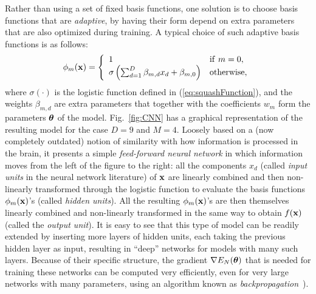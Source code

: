 \documentclass[10pt,twoside]{book}
\begin{document}
Rather than using 
a set of fixed
basis functions, one solution is to 
choose basis functions that are \emph{adaptive},
by having their form 
depend on extra parameters that are also optimized during training. A typical choice of such adaptive basis functions is as follows:
\begin{equation}
  \phi_m( \mathbf{x} ) = 
  \left\{
  \begin{array}{ll}
  1 & \mathrm{if} \,\, m=0,\\
  \sigma\left( \sum_{d=1}^D \beta_{m,d} x_{d} + \beta_{m,0} \right) & \mathrm{otherwise,}
  \end{array}
  \right.
  \label{eq:adaptiveBasisFunction}
\end{equation}
where 
$\sigma(\cdot)$ is the logistic function defined in (\eqref{eq:squashFunction}),
and the weights 
$\beta_{m,d}$ 
are extra parameters 
that together with the coefficients 
$w_m$ 
form the 
parameters ${\mbox{\boldmath {${\theta}$}}}$
of the model.
%
Fig.~\ref{fig:CNN} has a graphical representation of the resulting model for the case $D=9$ and $M=4$.
Loosely based on a (now completely outdated) notion of similarity with how information is processed in the brain, it presents a simple \emph{feed-forward neural network} in which information moves from the left of the figure to the right:
all the 
components $x_d$ (called \emph{input units} in the neural network literature) of $\mathbf{x}$ are linearly combined and then non-linearly transformed through the logistic function to evaluate the basis functions $\phi_m( \mathbf{x} )$'s (called \emph{hidden units}). All the resulting $\phi_m( \mathbf{x} )$'s are 
then 
themselves
linearly combined and non-linearly transformed 
in the same way
to obtain $f(\mathbf{x})$ (called the \emph{output unit}).
It is easy to see that this type of model can be readily extended by inserting more layers of hidden units, 
each taking the previous hidden layer as 
input, resulting in ``deep'' networks for models with many 
such 
layers.
Because of their specific structure,
%
%
the gradient $\nabla E_N({\mbox{\boldmath {${\theta}$}}})$ 
that is
needed for training these networks can be 
computed very efficiently,
even for very large networks with many parameters, 
using an algorithm known as \emph{backpropagation}~\cite{rumelhart1986learning}).
\end{document}
